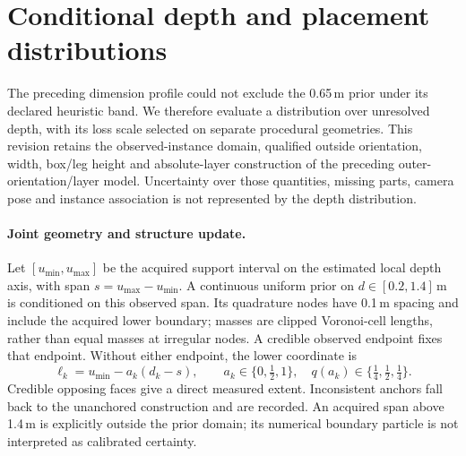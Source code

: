 \section{Conditional depth and placement distributions}
\label{sec:conditional-depth-calibration}

The preceding dimension profile could not exclude the 0.65\,m prior under its
declared heuristic band. We therefore evaluate a distribution over unresolved
depth, with its loss scale selected on separate procedural geometries. This
revision retains the observed-instance domain, qualified outside orientation,
width, box/leg height and absolute-layer construction of the preceding
outer-orientation/layer model. Uncertainty over those quantities, missing
parts, camera pose and instance association is not represented by the depth
distribution.

\paragraph{Joint geometry and structure update.}
Let $[u_{\min},u_{\max}]$ be the acquired support interval on the estimated
local depth axis, with span $s=u_{\max}-u_{\min}$. A continuous uniform prior
on $d\in[0.2,1.4]$\,m is conditioned on this observed span. Its quadrature
nodes have 0.1\,m spacing and include the acquired lower boundary; masses are
clipped Voronoi-cell lengths, rather than equal masses at irregular nodes.
A credible observed endpoint fixes that endpoint. Without either endpoint,
the lower coordinate is
\begin{equation}
 \ell_k=u_{\min}-a_k(d_k-s),\qquad
 a_k\in\{0,\tfrac12,1\},\quad
 q(a_k)\in\{\tfrac14,\tfrac12,\tfrac14\}.
\end{equation}
Credible opposing faces give a direct measured extent. Inconsistent anchors
fall back to the unanchored construction and are recorded. An acquired span
above 1.4\,m is explicitly outside the prior domain; its numerical boundary
particle is not interpreted as calibrated certainty.

